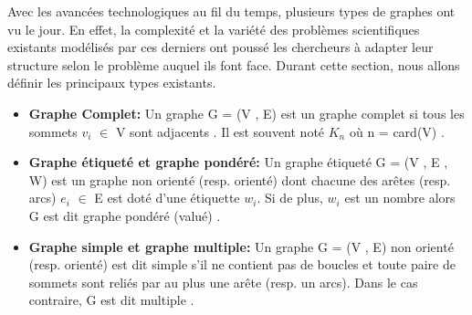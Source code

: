 	Avec les avancées technologiques au fil du temps, plusieurs types de graphes ont vu le jour. En effet, la complexité et la variété des problèmes scientifiques existants modélisés par ces derniers ont poussé les chercheurs à adapter leur structure selon le problème auquel ils font face. Durant cette section, nous allons définir les principaux types existants.
	
		\begin{itemize}[label=$\circ$]
		
			\item \textbf{Graphe Complet:} Un graphe G = (V , E) est un graphe complet si tous les sommets $v_{i}$ $\in$ V sont adjacents \citep{Pres}. Il est souvent noté $K_{n}$ où n = card(V) \citep{DUT}.
				
			
			\item \textbf{Graphe étiqueté et graphe pondéré:}
			 Un graphe étiqueté G = (V , E , W) est un graphe non orienté (resp. orienté) dont chacune des arêtes (resp. arcs) $e_{i}$ $\in$ E est doté d'une étiquette $w_{i}$. Si de plus, $w_{i}$ est un nombre alors G est dit graphe pondéré (valué) \citep{DUT}.
		
			\item \textbf{Graphe simple et graphe multiple:}
			Un graphe G = (V , E) non orienté (resp. orienté) est dit simple s'il ne contient pas de boucles et toute paire de sommets sont reliés par au plus une arête (resp. un arcs). Dans le cas contraire, G est dit multiple \citep{IUTLyonInformatique}.
			
		
		\end{itemize}
		